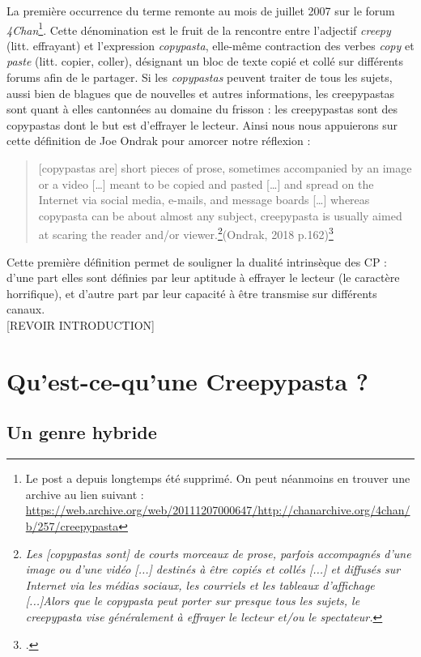 \documentclass[12pt,a4paper,oneside,titlepage]{book} %
\begin{document}
	\par
	La première occurrence du terme remonte au mois de juillet 2007 sur le forum \emph{4Chan}\footnote{Le post a depuis longtemps été supprimé. On peut néanmoins en trouver une archive au lien suivant : \url{https://web.archive.org/web/20111207000647/http://chanarchive.org/4chan/b/257/creepypasta}}. Cette dénomination est le fruit de la rencontre entre l'adjectif \emph{creepy} (litt. effrayant) et l'expression \emph{copypasta}, elle-même contraction des verbes \emph{copy} et \emph{paste} (litt. copier, coller), désignant un bloc de texte copié et collé sur différents forums afin de le partager. Si les \emph{copypastas} peuvent traiter de tous les sujets, aussi bien de blagues que de nouvelles et autres informations, les creepypastas sont quant à elles cantonnées au domaine du frisson : les creepypastas sont des copypastas dont le but est d'effrayer le lecteur. Ainsi nous nous appuierons sur cette définition de Joe Ondrak pour amorcer notre réflexion : 



\begin{quotation}
	[copypastas are] short pieces of prose, sometimes accompanied by an image or a video […] meant to be copied
			and pasted […] and spread on the Internet via social media, e-mails, and message boards […]
			whereas copypasta can be about almost any subject, creepypasta is usually aimed at scaring
			the reader and/or viewer.\footnote{\emph{Les [copypastas sont] de courts morceaux de prose, parfois accompagnés d'une image ou d'une vidéo [...] destinés à être copiés et collés [...] et diffusés sur Internet via les médias sociaux, les courriels et les tableaux d'affichage [...]Alors que le copypasta peut porter sur presque tous les sujets, le creepypasta vise généralement à effrayer le lecteur et/ou le spectateur.}}(Ondrak, 2018 p.162)\footcite{ondrak_spectres_2018}
\end{quotation}
	\par
	Cette première définition permet de souligner la dualité intrinsèque des CP : d'une part elles sont définies par leur aptitude à effrayer le lecteur (le caractère horrifique), et d'autre part par leur capacité à être transmise sur différents canaux. \\
	
	[REVOIR INTRODUCTION]
\part{Qu'est-ce-qu'une Creepypasta ?}
\chapter{Un genre hybride}
	
\end{document}
